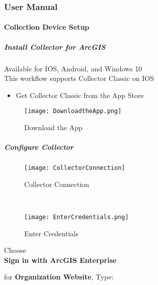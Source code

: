   
  
  
  
  
  
  
  
  
  
  
  
  
  
  \clearpage
  \subsubsection[User Manual]{\Large User Manual}
  \paragraph{Collection Device Setup}
  \subparagraph{Install Collector for ArcGIS}
	\noindent Available for IOS, Android, and Windows 10\\
	\noindent This workflow supports Collector Classic on IOS
  \begin{itemize}
  \item Get Collector Classic from the App Store
  \end{itemize}
  \begin{figure}[h!]
  \centering
      \texttt{[image: DownloadtheApp.png]}
  \caption{Download the App}
  \end{figure}
  \clearpage
  \subparagraph[Configure Collector]{\Large Configure Collector}
  \begin{wrapfigure}{r}{0.5\textwidth}
  \centering
  \texttt{[image: CollectorConnection]}
  \caption{Collector Connection}

  \HRule \\[.4cm] %
  \vspace{.1in}

      \texttt{[image: EnterCredentials.png]}
  \vspace{-.1in}

  \caption{Enter Credentials}
  \end{wrapfigure}

  Choose\\
  \noindent \textbf{Sign in with ArcGIS Enterprise}
  
 \vspace{.25in}
  
 for \textbf{Organization Website}, Type:
  
